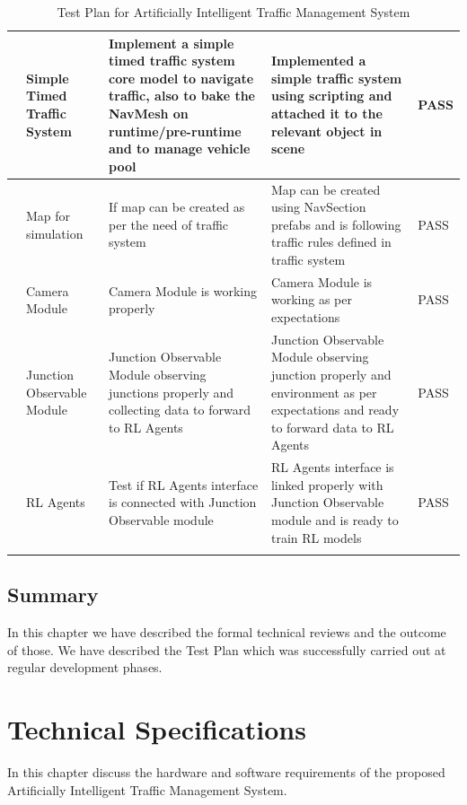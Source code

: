 \documentclass[openany,12pt]{report}
\begin{document}
\begin{longtable}{|p{0.6cm}|p{3.5cm}|p{5cm}|p{3.5cm}|p{1.7cm}|}
			\addtocounter{num}{1}
			\thenum&
			Simple Timed Traffic System&
			Implement a simple timed traffic system core model to navigate traffic, also to bake the NavMesh on runtime/pre-runtime and to manage vehicle pool&
			Implemented a simple traffic system using scripting and attached it to the relevant object in scene&
			PASS\\\hline
			
			\addtocounter{num}{1}
			\thenum&
			Map for simulation&
			If map can be created as per the need of traffic system&
			Map can be created using NavSection prefabs and is following traffic rules defined in traffic system&
			PASS\\\hline
			
			\addtocounter{num}{1}
			\thenum&
			Camera Module&
			Camera Module is working properly&
			Camera Module is working as per expectations&
			PASS\\\hline
			
			\addtocounter{num}{1}
			\thenum&
			Junction Observable Module&
			Junction Observable Module observing junctions properly and collecting data to forward to RL Agents&
			Junction Observable Module observing junction properly and environment as per expectations and ready to forward data to RL Agents&
			PASS\\\hline
			
			\addtocounter{num}{1}
			\thenum&
			RL Agents&
			Test if RL Agents interface is connected with Junction Observable module&
			RL Agents interface is linked properly with Junction Observable module and is ready to train RL models&
			PASS\\\hline
			
			\caption{Test Plan for Artificially Intelligent Traffic Management System}
			\label{tab:nnwork}
		\end{longtable}
		
		\section{Summary}
		\hspace{0.5in}In this chapter we have described the formal technical reviews and the outcome of those. We have described the Test Plan which was successfully carried out at regular development phases.\\
		
	
	\chapter{Technical Specifications}
	\hspace*{0.5in}In this chapter discuss the hardware and software requirements of the proposed Artificially Intelligent Traffic Management System.
	
\end{document}
